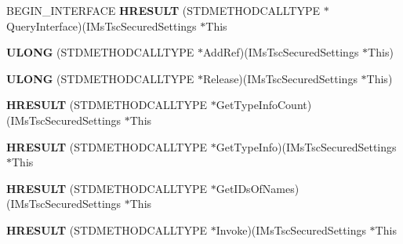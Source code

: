 \begin{DoxyCompactItemize}
\item 
\mbox{\label{struct_i_ms_tsc_secured_settings_vtbl_a796e678e857c2a48535d97b77429e390}} 
B\+E\+G\+I\+N\+\_\+\+I\+N\+T\+E\+R\+F\+A\+CE {\bfseries H\+R\+E\+S\+U\+LT} (S\+T\+D\+M\+E\+T\+H\+O\+D\+C\+A\+L\+L\+T\+Y\+PE $\ast$Query\+Interface)(I\+Ms\+Tsc\+Secured\+Settings $\ast$This
\item 
\mbox{\label{struct_i_ms_tsc_secured_settings_vtbl_aac45183360a8fb8c6b1f30c3fe5a0858}} 
{\bfseries U\+L\+O\+NG} (S\+T\+D\+M\+E\+T\+H\+O\+D\+C\+A\+L\+L\+T\+Y\+PE $\ast$Add\+Ref)(I\+Ms\+Tsc\+Secured\+Settings $\ast$This)
\item 
\mbox{\label{struct_i_ms_tsc_secured_settings_vtbl_ace5abaf3663d0395195922e53b7c6fa5}} 
{\bfseries U\+L\+O\+NG} (S\+T\+D\+M\+E\+T\+H\+O\+D\+C\+A\+L\+L\+T\+Y\+PE $\ast$Release)(I\+Ms\+Tsc\+Secured\+Settings $\ast$This)
\item 
\mbox{\label{struct_i_ms_tsc_secured_settings_vtbl_a6dca1e8722668b2b49984b18bb6246ad}} 
{\bfseries H\+R\+E\+S\+U\+LT} (S\+T\+D\+M\+E\+T\+H\+O\+D\+C\+A\+L\+L\+T\+Y\+PE $\ast$Get\+Type\+Info\+Count)(I\+Ms\+Tsc\+Secured\+Settings $\ast$This
\item 
\mbox{\label{struct_i_ms_tsc_secured_settings_vtbl_aa590d4a5c2e7c535d6c85a04aec6635b}} 
{\bfseries H\+R\+E\+S\+U\+LT} (S\+T\+D\+M\+E\+T\+H\+O\+D\+C\+A\+L\+L\+T\+Y\+PE $\ast$Get\+Type\+Info)(I\+Ms\+Tsc\+Secured\+Settings $\ast$This
\item 
\mbox{\label{struct_i_ms_tsc_secured_settings_vtbl_a13f3ad516912093fa1a1a23f978bceb9}} 
{\bfseries H\+R\+E\+S\+U\+LT} (S\+T\+D\+M\+E\+T\+H\+O\+D\+C\+A\+L\+L\+T\+Y\+PE $\ast$Get\+I\+Ds\+Of\+Names)(I\+Ms\+Tsc\+Secured\+Settings $\ast$This
\item 
\mbox{\label{struct_i_ms_tsc_secured_settings_vtbl_ad51395ce8332187280a1623f354d9e93}} 
{\bfseries H\+R\+E\+S\+U\+LT} (S\+T\+D\+M\+E\+T\+H\+O\+D\+C\+A\+L\+L\+T\+Y\+PE $\ast$Invoke)(I\+Ms\+Tsc\+Secured\+Settings $\ast$This
\item 

\end{DoxyCompactItemize}
